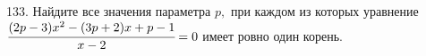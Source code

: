 133. Найдите все значения параметра $p,$ при каждом из которых уравнение\\ $\cfrac{(2p-3)x^2-(3p+2)x+p-1}{x-2}=0$ имеет ровно один корень.\\
